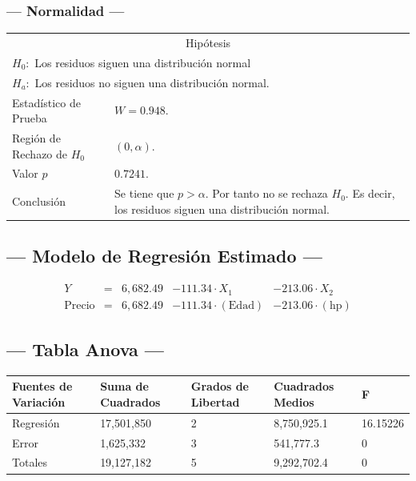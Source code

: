 \subsubsection{--- Normalidad ---} %
\begin{center}
  \begin{tabular}{|l|p{8cm}|}
    \cline{1-2}
    \multicolumn{2}{|c|}{Hipótesis}\\ \cline{1-2}
    \multicolumn{2}{|l|}{\(H_0:\) Los residuos siguen una distribución normal} \\ 
    \multicolumn{2}{|l|}{\(H_a:\) Los residuos no siguen una distribución normal.} \\ \cline{1-2}
    Estadístico de Prueba & \(W = 0.948\).\\ \cline{1-2} 
		Región de Rechazo de \(H_0\) & \((0, \alpha )\).\\ \cline{1-2} 
    Valor \(p\) & \(0.7241\).\\ \cline{1-2} 
    Conclusión & Se tiene que \(p> \alpha\). \newline 
		Por tanto no se rechaza \(H_0\). \newline 
		Es decir, los residuos siguen una distribución normal.\\ \cline{1-2} 
  \end{tabular}
\end{center}


\subsection{\centering --- Modelo de Regresión Estimado ---} %
\begin{align}
	Y & = &              6,682.49 & - 111.34 \cdot X_1           & - 213.06     \cdot X_2   \\[2mm]
	\mbox{Precio} & = &  6,682.49 & - 111.34 \cdot (\mbox{Edad}) & - 213.06     \cdot (\mbox{hp})
	\label{eq:4}
\end{align}

\subsection{\centering --- Tabla Anova ---} %
\begin{center}
  \begin{tabular}{|l|l|l|l|l|}
    \hline 
    Fuentes de Variación  & Suma de Cuadrados & Grados de Libertad & Cuadrados Medios & F\\ \hline 
		Regresión & 17,501,850 & 2 & 8,750,925.1 & 16.15226 \\ \hline
		Error     &  1,625,332 & 3 &   541,777.3 &  0 \\ \hline
		Totales   & 19,127,182 & 5 & 9,292,702.4 &  0 \\ \hline
  \end{tabular}
\end{center} 


